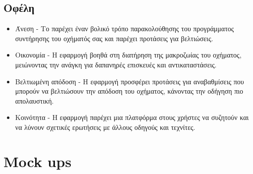 \documentclass[11pt]{scrartcl} %
\begin{document}
\subsection{Οφέλη}
    \begin{itemize}
        \item Άνεση - Το  παρέχει έναν βολικό τρόπο παρακολούθησης του προγράμματος συντήρησης του οχήματός σας και παρέχει προτάσεις για βελτιώσεις.
        \item Οικονομία - Η εφαρμογή βοηθά στη διατήρηση της μακροζωίας του οχήματος, μειώνοντας την ανάγκη για δαπανηρές επισκευές και αντικαταστάσεις.
        \item Βελτιωμένη απόδοση - Η εφαρμογή προσφέρει προτάσεις για αναβαθμίσεις που μπορούν να βελτιώσουν την απόδοση του οχήματος, κάνοντας την οδήγηση πιο απολαυστική.
        \item Κοινότητα - Η εφαρμογή παρέχει μια πλατφόρμα στους χρήστες να συζητούν και να λύνουν σχετικές ερωτήσεις με άλλους οδηγούς και τεχνίτες.
    \end{itemize}

\pagebreak

\section{Mock ups \cite{materialdesign}}
\end{document}
